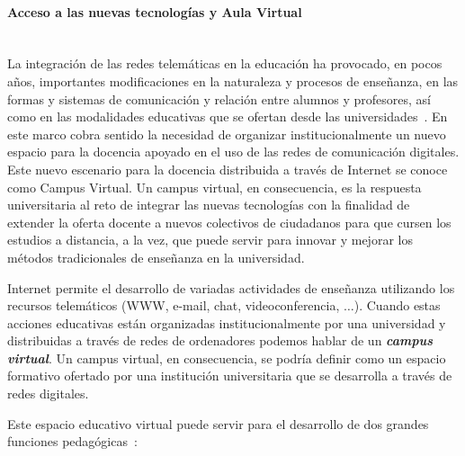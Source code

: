 \paragraph{Acceso a las nuevas tecnologías y Aula Virtual\\\\} \label{sec:aulavirt}

La integración de las redes telemáticas en la educación ha provocado, en pocos años, importantes modificaciones en la naturaleza y procesos de enseñanza, en las formas y sistemas de comunicación y relación entre alumnos y profesores, así como en las modalidades educativas que se ofertan desde las universidades~\cite{duder97,pimentel99,reid99}. En este marco cobra sentido la necesidad de organizar institucionalmente un nuevo espacio para la docencia apoyado en el uso de las redes de comunicación digitales. Este nuevo escenario para la docencia distribuida a través de Internet se conoce como Campus Virtual. Un campus virtual, en consecuencia, es la respuesta universitaria al reto de integrar las nuevas tecnologías con la finalidad de extender la oferta docente a nuevos colectivos de ciudadanos para que cursen los estudios a distancia, a la vez, que puede servir para innovar y mejorar los métodos tradicionales de enseñanza en la universidad.

Internet permite el desarrollo de variadas actividades de enseñanza utilizando los recursos telemáticos (WWW, e-mail, chat, videoconferencia, $\ldots$). Cuando estas acciones educativas están organizadas institucionalmente por una universidad y distribuidas a través de redes de ordenadores podemos hablar de un \textbf{\emph{campus virtual}}. Un campus virtual, en consecuencia, se podría definir como un espacio formativo ofertado por una institución universitaria que se desarrolla a través de redes digitales.

Este espacio educativo virtual puede servir para el desarrollo de dos grandes funciones pedagógicas~\cite{area01}:

